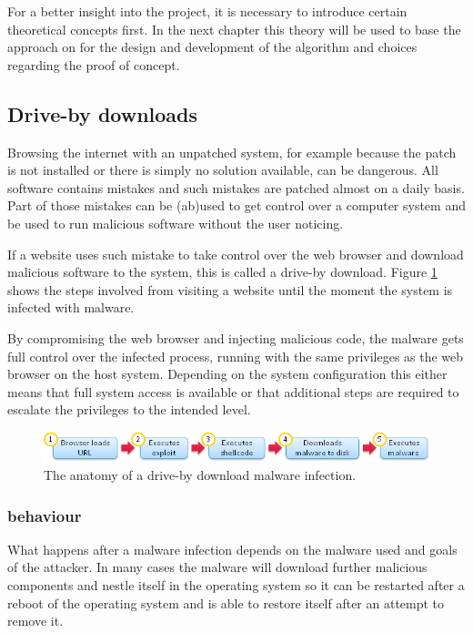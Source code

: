 For a better insight into the project, it is necessary to introduce certain theoretical concepts first. In the next chapter this theory will be used to base the approach on for the design and development of the algorithm and choices regarding the proof of concept.

\subsection{Drive-by downloads}

Browsing the internet with an unpatched system, for example because the patch is not installed or there is simply no solution available, can be dangerous. All software contains mistakes and such mistakes are patched almost on a daily basis. Part of those mistakes can be (ab)used to get control over a computer system and be used to run malicious software without the user noticing.

If a website uses such mistake to take control over the web browser and download malicious software to the system, this is called a drive-by download. Figure \ref{fig:dbdownload} shows the steps involved from visiting a website until the moment the system is infected with malware.

By compromising the web browser and injecting malicious code, the malware gets full control over the infected process, running with the same privileges as the web browser on the host system. Depending on the system configuration this either means that full system access is available or that additional steps are required to escalate the privileges to the intended level.


\begin{figure}[h]
    \centering
    \includegraphics[width=12cm]{Images/drive-by-download.png}
    \caption{The anatomy of a drive-by download malware infection. \cite{http://blog.armorize.com/2011/04/newest-adobe-flash-0-day-used-in-new.html (modified)}}
    \label{fig:dbdownload}
\end{figure}

\subsubsection{behaviour}

What happens after a malware infection depends on the malware used and goals of the attacker. In many cases the malware will download further malicious components and nestle itself in the operating system so it can be restarted after a reboot of the operating system and is able to restore itself after an attempt to remove it.

